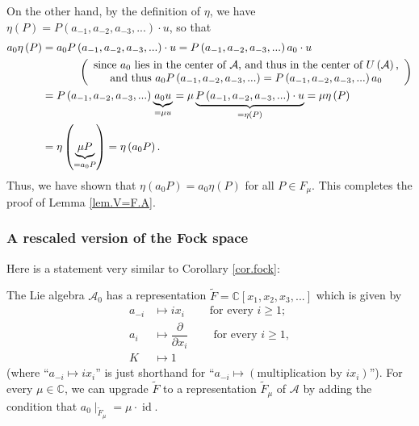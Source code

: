\documentclass[etingof-lie.tex]{subfiles}
\begin{document}
On the other hand, by the definition of $\eta$, we have $\eta\left(  P\right)
=P\left(  a_{-1},a_{-2},a_{-3},...\right)  \cdot u$, so that%
\begin{align*}
a_{0}\eta\left(  P\right)   &  =a_{0}P\left(  a_{-1},a_{-2},a_{-3},...\right)
\cdot u=P\left(  a_{-1},a_{-2},a_{-3},...\right)  a_{0}\cdot u\\
&  \ \ \ \ \ \ \ \ \ \ \left(
\begin{array}
[c]{c}%
\text{since }a_{0}\text{ lies in the center of }\mathcal{A}\text{, and thus in
the center of }U\left(  \mathcal{A}\right)  \text{,}\\
\text{and thus }a_{0}P\left(  a_{-1},a_{-2},a_{-3},...\right)  =P\left(
a_{-1},a_{-2},a_{-3},...\right)  a_{0}%
\end{array}
\right) \\
&  =P\left(  a_{-1},a_{-2},a_{-3},...\right)  \underbrace{a_{0}u}_{=\mu u}%
=\mu\underbrace{P\left(  a_{-1},a_{-2},a_{-3},...\right)  \cdot u}%
_{=\eta\left(  P\right)  }=\mu\eta\left(  P\right) \\
&  =\eta\left(  \underbrace{\mu P}_{=a_{0}P}\right)  =\eta\left(
a_{0}P\right)  .
\end{align*}
Thus, we have shown that $\eta\left(  a_{0}P\right)  =a_{0}\eta\left(
P\right)  $ for all $P\in F_{\mu}$. This completes the proof of Lemma
\ref{lem.V=F.A}.

\subsubsection{A rescaled version of the Fock space}

Here is a statement very similar to Corollary \ref{cor.fock}:

\begin{corollary}
\label{cor.focktilde}The Lie algebra $\mathcal{A}_{0}$ has a representation
$\widetilde{F}=\mathbb{C}\left[  x_{1},x_{2},x_{3},...\right]  $ which is
given by
\begin{align*}
a_{-i}  &  \mapsto ix_{i}\ \ \ \ \ \ \ \ \ \ \text{for every }i\geq1;\\
a_{i}  &  \mapsto\dfrac{\partial}{\partial x_{i}}\ \ \ \ \ \ \ \ \ \ \text{for
every }i\geq1,\\
K  &  \mapsto1
\end{align*}
(where ``$a_{-i}\mapsto ix_{i}$'' is just shorthand for ``$a_{-i}%
\mapsto\left(  \text{multiplication by }ix_{i}\right)  $''). For every $\mu
\in\mathbb{C}$, we can upgrade $\widetilde{F}$ to a representation
$\widetilde{F}_{\mu}$ of $\mathcal{A}$ by adding the condition that $a_{0}%
\mid_{\widetilde{F}_{\mu}}=\mu\cdot\operatorname*{id}$.
\end{corollary}
\end{document}
